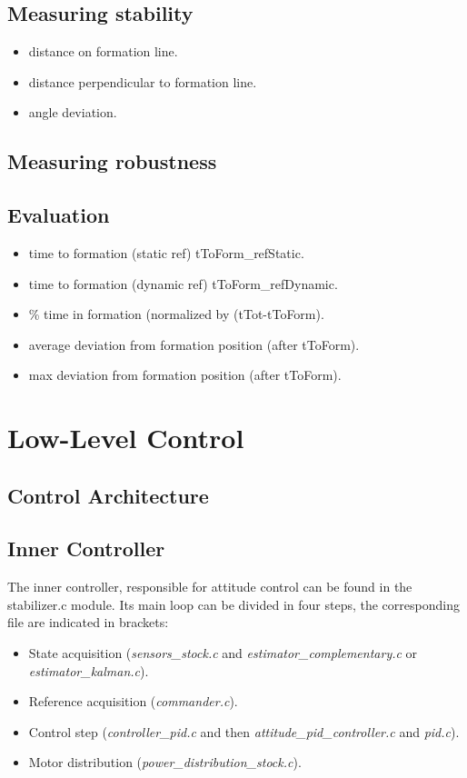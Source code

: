 \documentclass[a4paper, 12pt]{report}
\begin{document}
\subsection{Measuring stability}
\cite{Mataric2002}
\begin{itemize}
\item distance on formation line.
\item distance perpendicular to formation line.
\item angle deviation.
\end{itemize}

\subsection{Measuring robustness}

\subsection{Evaluation}
\begin{itemize}
\item time to formation (static ref) tToForm\_refStatic.
\item time to formation (dynamic ref) tToForm\_refDynamic.
\item \% time in formation (normalized by (tTot-tToForm).
\item average deviation from formation position (after tToForm).
\item max deviation from formation position (after tToForm).

\end{itemize}

\cite{Arkin1999}
\cite{Mataric2002}

\newpage
\section{Low-Level Control}
\subsection{Control Architecture}
\subsection{Inner Controller}
\label{sec:innerControl}
The inner controller, responsible for attitude control can be found in the stabilizer.c module. Its main loop can be divided in four steps, the corresponding file are indicated in brackets:
\begin{itemize}
\item State acquisition (\emph{sensors\_stock.c} and \emph{estimator\_complementary.c}  or \emph{estimator\_kalman.c}).
\item Reference acquisition (\emph{commander.c}).
\item Control step (\emph{controller\_pid.c} and then \emph{attitude\_pid\_controller.c} and \emph{pid.c}).
\item Motor distribution (\emph{power\_distribution\_stock.c}).
\end{itemize}
\end{document}
